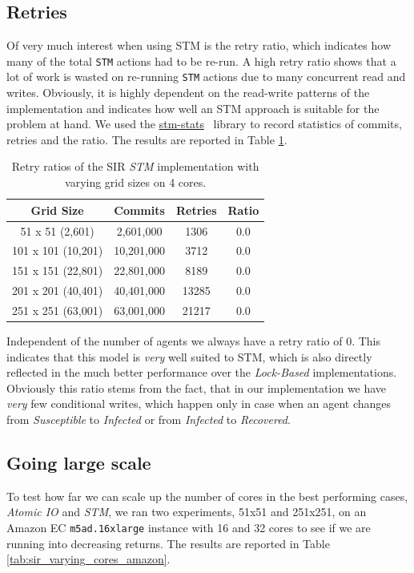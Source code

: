 \subsection{Retries}
Of very much interest when using STM is the retry ratio, which indicates how many of the total \texttt{STM} actions had to be re-run. A high retry ratio shows that a lot of work is wasted on re-running \texttt{STM} actions due to many concurrent read and writes. Obviously, it is highly dependent on the read-write patterns of the implementation and indicates how well an STM approach is suitable for the problem at hand. We used the \href{http://hackage.haskell.org/package/stm-stats}{stm-stats}~\cite{stm_stats_library} library to record statistics of commits, retries and the ratio. The results are reported in Table \ref{tab:retries_stm}.

\begin{table}
	\centering
  	\begin{tabular}{ c || c | c | c }
        Grid Size 		   & Commits     & Retries  & Ratio  \\ \hline \hline 
   		51 x 51 (2,601)     & 2,601,000   & 1306     & 0.0    \\ \hline
   		101 x 101 (10,201)  & 10,201,000  & 3712     & 0.0    \\ \hline
   		151 x 151 (22,801)  & 22,801,000  & 8189     & 0.0    \\ \hline
   		201 x 201 (40,401)  & 40,401,000  & 13285    & 0.0    \\ \hline
   		251 x 251 (63,001)  & 63,001,000  & 21217    & 0.0    \\ \hline \hline
  	\end{tabular}
  	
  	\caption{Retry ratios of the SIR \textit{STM} implementation with varying grid sizes on 4 cores.}
	\label{tab:retries_stm}
\end{table}

Independent of the number of agents we always have a retry ratio of 0. This indicates that this model is \textit{very} well suited to STM, which is also directly reflected in the much better performance over the \textit{Lock-Based} implementations. Obviously this ratio stems from the fact, that in our implementation we have \textit{very} few conditional writes, which happen only in case when an agent changes from \textit{Susceptible} to \textit{Infected} or from \textit{Infected} to \textit{Recovered}. 

\subsection{Going large scale}
To test how far we can scale up the number of cores in the best performing cases, \textit{Atomic IO} and \textit{STM}, we ran two experiments, 51x51 and 251x251, on an Amazon EC \texttt{m5ad.16xlarge} instance with 16 and 32 cores to see if we are running into decreasing returns. The results are reported in Table \ref{tab:sir_varying_cores_amazon}.

